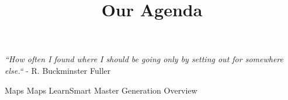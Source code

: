 \documentclass{ximera}
\title{Our Agenda}
\begin{document}
\begin{abstract}

\end{abstract}
\maketitle

\emph{``How often I found where I should be going only by setting out for somewhere else.``} - R. Buckminster Fuller


\begin{itemize}
  \Empathy Maps
  \Impact Maps
  \Review LearnSmart Master
  \Solution Generation
  \Contract Overview
\end{itemize}
\end{document}
